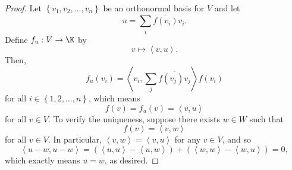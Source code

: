 \documentclass[linearalgebraII]{subfiles}
\begin{document}
    \begin{proof}
        Let $\left\lbrace v_1,v_2,\ldots,v_n \right\rbrace$ be an orthonormal basis for $V$ and let 
        \begin{equation*}
            u = \sum^{}_{i} \overline{f\left( v_i \right) }v_i.
        \end{equation*}
        Define $f_u:V\to\K$ by
        \begin{equation*}
            v\mapsto\left\langle v, u\right\rangle .
        \end{equation*}
        Then,
        \begin{equation*}
            f_u\left( v_i \right) = \left\langle v_i, \sum^{}_{j} \overline{f\left( v_j \right)v_j }\right\rangle f\left( v_i \right) 
        \end{equation*}
        for all $i\in\left\lbrace 1,2,\ldots,n \right\rbrace $, which means
        \begin{equation*}
            f(v) = f_u(v) = \left\langle v, u\right\rangle 
        \end{equation*}
        for all $v\in V$. To verify the uniqueness, suppose there exists $w\in W$ such that
        \begin{equation*}
            f(v) = \left\langle v, w\right\rangle 
        \end{equation*}
        for all $v\in V$. In particular, $\left\langle v, w\right\rangle = \left\langle v, u\right\rangle$ for any $v\in V$, and so
        \begin{equation*}
            \left\langle u-w, u-w\right\rangle = \left( \left\langle u, u\right\rangle - \left\langle u, w\right\rangle  \right) + \left( \left\langle w, w\right\rangle - \left\langle w, u\right\rangle  \right) = 0,
        \end{equation*}
        which exactly means $u = w$, as desired.
    \end{proof}
\end{document}

